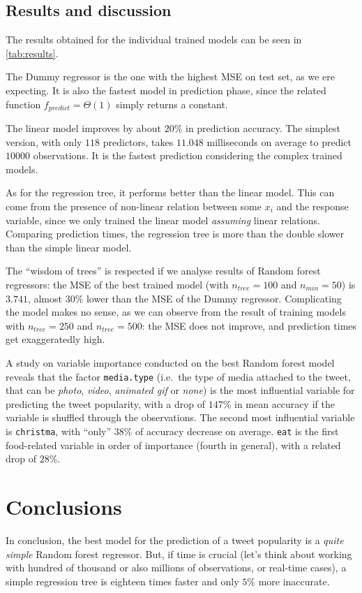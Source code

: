 \documentclass[letterpaper,11pt,english,twocolumn]{article}
\begin{document}
\subsection{Results and discussion}
\label{ssec:results_and_discussion}
The results obtained for the individual trained models can be seen in \autoref{tab:results}.

The Dummy regressor is the one with the highest MSE on test set, as we ere expecting. It is also the fastest model in prediction phase, since the related function $f_{predict} = \Theta (1)$ simply returns a constant.

The linear model improves by about $20\%$ in prediction accuracy. The simplest version, with only $118$ predictors, takes $11.048$ milliseconds on average to predict $10000$ observations. It is the fastest prediction considering the complex trained models.

As for the regression tree, it performs better than the linear model. This can come from the presence of non-linear relation between some $x_i$ and the response variable, since we only trained the linear model \textit{assuming} linear relations. Comparing prediction times, the regression tree is more than the double slower than the simple linear model.

The ``wisdom of trees'' is respected if we analyse results of Random forest regressors: the MSE of the best trained model (with $n_{tree}=100$ and $n_{min}=50$) is $3.741$, almost $30\%$ lower than the MSE of the Dummy regressor. Complicating the model makes no sense, as we can observe from the result of training models with $n_{tree}=250$ and $n_{tree}=500$: the MSE does not improve, and prediction times get exaggeratedly high.

A study on variable importance conducted on the best Random forest model reveals that the factor \texttt{media.type} (i.e.~the type of media attached to the tweet, that can be \textit{photo}, \textit{video}, \textit{animated gif} or \textit{none}) is the most influential variable for predicting the tweet popularity, with a drop of $147\%$ in mean accuracy if the variable is shuffled through the observations. The second most influential variable is \texttt{christma}, with ``only'' $38\%$ of accuracy decrease on average. \texttt{eat} is the first food-related variable in order of importance (fourth in general), with a related drop of $28\%$.


\section{Conclusions}
\label{sec:conclusions}
In conclusion, the best model for the prediction of a tweet popularity is a \textit{quite simple} Random forest regressor. But, if time is crucial (let's think about working with hundred of thousand or also millions of observations, or real-time cases), a simple regression tree is eighteen times faster and only $5\%$ more inaccurate.
\end{document}
